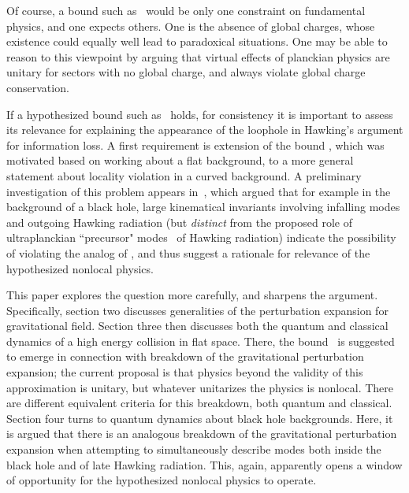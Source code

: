 Of course, a bound such as \gravbd\ would be only one constraint on fundamental physics,  and one expects others.  One is the absence of global charges, whose existence could equally well lead to paradoxical situations. One may be able to reason to this viewpoint by arguing that virtual effects of planckian physics are unitary for sectors with no global charge, and always violate global charge conservation.

If a hypothesized bound such as \gravbd\ holds, for consistency it is important to assess its relevance for explaining the appearance of the loophole in Hawking's argument for information loss.   A first requirement is extension of the bound \gravbd, which was motivated based on working about a flat background, to a more general statement about locality violation in a curved background.   A preliminary investigation of this problem appears in~, which argued that for example in the background of a black hole, large kinematical invariants involving infalling modes and outgoing Hawking radiation (but {\it distinct} from the proposed role of ultraplanckian ``precursor" modes~ of Hawking radiation) indicate the possibility of violating the analog of \gravbd, and thus suggest a rationale for relevance of the hypothesized nonlocal physics.   

This paper explores the question more carefully, and sharpens the argument.  Specifically, section two discusses generalities of the perturbation expansion for gravitational field.  Section three then discusses both the quantum and classical dynamics of a high energy collision in flat space.  There, the bound \gravbd\ is suggested to emerge in connection with breakdown of the gravitational perturbation expansion; the current proposal is that physics beyond the validity of this  approximation is unitary, but whatever unitarizes the physics is nonlocal.  There are different equivalent criteria for this breakdown, both quantum and classical.  Section four turns to quantum dynamics about black hole backgrounds.  Here, it is argued that there is an analogous breakdown of the gravitational perturbation expansion when attempting to simultaneously describe modes both inside the black hole and of late Hawking radiation.  This, again, apparently opens a window of opportunity for the hypothesized nonlocal physics to operate. 




